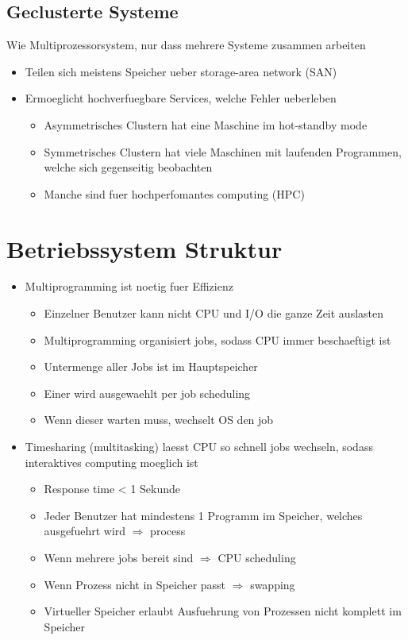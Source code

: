 \documentclass[a4paper]{scrreprt}
\begin{document}
\subsection{Geclusterte Systeme}
Wie Multiprozessorsystem, nur dass mehrere Systeme zusammen arbeiten

\begin{itemize}
	\item Teilen sich meistens Speicher ueber storage-area network (SAN)
	\item Ermoeglicht hochverfuegbare Services, welche Fehler ueberleben
		\begin{itemize}
			\item Asymmetrisches Clustern hat eine Maschine im hot-standby mode
			\item Symmetrisches Clustern hat viele Maschinen mit laufenden Programmen, welche sich gegenseitig beobachten
			\item Manche sind fuer hochperfomantes computing (HPC)
		\end{itemize}
\end{itemize}

\section{Betriebssystem Struktur}
\begin{itemize}
	\item Multiprogramming ist noetig fuer Effizienz
		\begin{itemize}
			\item Einzelner Benutzer kann nicht CPU und I/O die ganze Zeit auslasten
			\item Multiprogramming organisiert jobs, sodass CPU immer beschaeftigt ist
			\item Untermenge aller Jobs ist im Hauptspeicher
			\item Einer wird ausgewaehlt per job scheduling
			\item Wenn dieser warten muss, wechselt OS den job
		\end{itemize}
	\item Timesharing (multitasking) laesst CPU so schnell jobs wechseln, sodass interaktives computing moeglich ist
		\begin{itemize}
			\item Response time < 1 Sekunde
			\item Jeder Benutzer hat mindestens 1 Programm im Speicher, welches ausgefuehrt wird $\Rightarrow$ process
			\item Wenn mehrere jobs bereit sind $\Rightarrow$ CPU scheduling
			\item Wenn Prozess nicht in Speicher passt $\Rightarrow$ swapping
			\item Virtueller Speicher erlaubt Ausfuehrung von Prozessen nicht komplett im Speicher
		\end{itemize}
\end{itemize}
\end{document}

